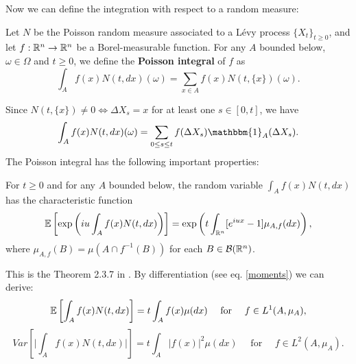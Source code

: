 \noindent
Now we can define the integration with respect to a random measure:
\begin{Definition} \label{Poisson_int}
 Let $N$ be the Poisson random measure associated to a Lévy process $\{X_t\}_{t \geq 0}$, and let $f:\mathbb{R}^n \to \mathbb{R}^n$ be a Borel-measurable
 function. For any $A$ bounded below, $\omega \in \Omega$ and $t\geq0$, we define the \textbf{Poisson integral} of $f$ as
 \begin{equation}
  \int_A f(x) N(t,dx)(\omega) = \sum_{x\in A} f(x) N(t,\{x\})(\omega). 
 \end{equation}
\end{Definition}
Since $N(t,\{x\}) \neq 0 \Leftrightarrow \Delta X_s=x$ for at least one $s\in [0,t]$, we have  
 \begin{equation}
  \int_A f(x) N(t,dx)(\omega) = \sum_{0 \leq s \leq t} f(\Delta X_s) \mathbbm{1}_A(\Delta X_s). 
 \end{equation}
The Poisson integral has the following important properties: 
\begin{Theorem}
 For $t\geq 0$ and for any $A$ bounded below, the random variable $\int_A f(x) N(t,dx)$ has the characteristic function
 \begin{equation}
  \mathbb{E} \left[ \exp \left( i u \int_A f(x) N(t,dx) \right) \right] = 
  \exp \left( t \int_{\mathbb{R}^n} [e^{iux}-1] \mu_{A,f}(dx) \right),
 \end{equation}
where $\mu_{A,f}(B) = \mu(A \cap f^{-1}(B))$ for each $B \in \mathcal{B}(\mathbb{R}^n)$.
\end{Theorem}
This is the Theorem 2.3.7 in \cite{Applebaum}. By differentiation (see eq. \ref{moments}) we can derive:
\begin{equation}\label{Exp_poiss}
 \mathbb{E} \left[ \int_A f(x) N(t,dx) \right] = t \int_A f(x) \mu(dx) \quad \mbox{ for } \quad f \in L^1(A,\mu_A),
\end{equation}
\begin{equation}
 Var \left[ \biggr|\int_A f(x) N(t,dx)\biggr|\right] = t \int_A |f(x)|^2 \mu(dx) \quad \mbox{ for } \quad f \in L^2(A,\mu_A).
\end{equation}

